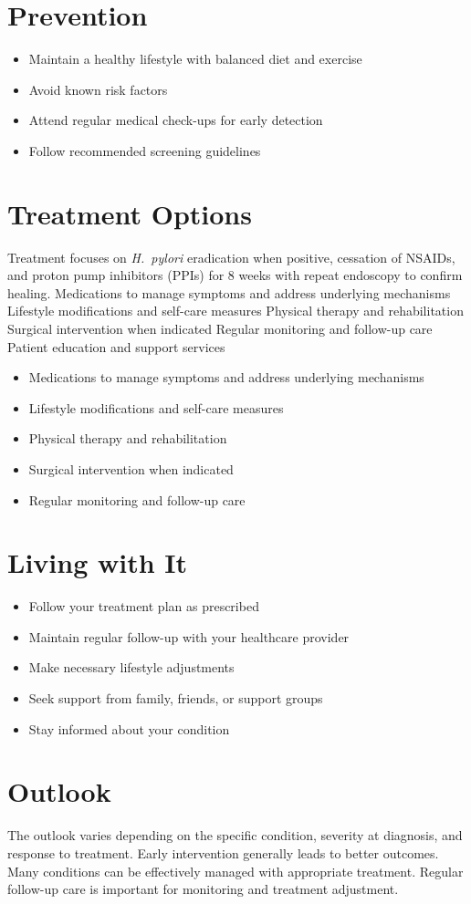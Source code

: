 \section{Prevention}
\begin{itemize}[noitemsep]
  \item Maintain a healthy lifestyle with balanced diet and exercise
  \item Avoid known risk factors
  \item Attend regular medical check-ups for early detection
  \item Follow recommended screening guidelines
\end{itemize}
\section{Treatment Options}
Treatment focuses on \textit{H.~pylori} eradication when positive, cessation of NSAIDs, and proton pump inhibitors (PPIs) for 8 weeks with repeat endoscopy to confirm healing. Medications to manage symptoms and address underlying mechanisms Lifestyle modifications and self-care measures Physical therapy and rehabilitation Surgical intervention when indicated Regular monitoring and follow-up care Patient education and support services

\begin{itemize}[noitemsep]
  \item Medications to manage symptoms and address underlying mechanisms
  \item Lifestyle modifications and self-care measures
  \item Physical therapy and rehabilitation
  \item Surgical intervention when indicated
  \item Regular monitoring and follow-up care
\end{itemize}
\section{Living with It}
\begin{itemize}[noitemsep]
  \item Follow your treatment plan as prescribed
  \item Maintain regular follow-up with your healthcare provider
  \item Make necessary lifestyle adjustments
  \item Seek support from family, friends, or support groups
  \item Stay informed about your condition
\end{itemize}
\section{Outlook}
The outlook varies depending on the specific condition, severity at diagnosis, and response to treatment. Early intervention generally leads to better outcomes. Many conditions can be effectively managed with appropriate treatment. Regular follow-up care is important for monitoring and treatment adjustment.
